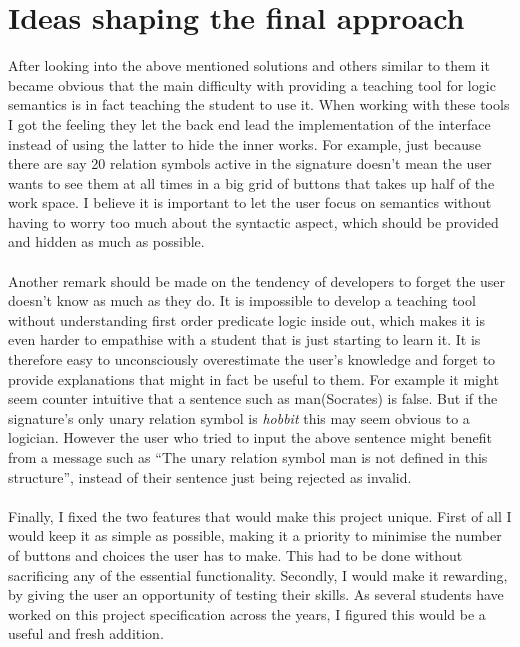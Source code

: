 \documentclass{report}
\begin{document}
\section{Ideas shaping the final approach}
After looking into the above mentioned solutions and others similar to them it became obvious that the main difficulty with providing a teaching tool for logic semantics is in fact teaching the student to use it. When working with these tools I got the feeling they let the back end lead the implementation of the interface instead of using the latter to hide the inner works. For example, just because there are say 20 relation symbols active in the signature doesn't mean the user wants to see them at all times in a big grid of buttons that takes up half of the work space. I believe it is important to let the user focus on semantics without having to worry too much about the syntactic aspect, which should be provided and hidden as much as possible. \\ \\
Another remark should be made on the tendency of developers to forget the user doesn't know as much as they do. It is impossible to develop a teaching tool without understanding first order predicate logic inside out, which makes it is even harder to empathise with a student that is just starting to learn it. It is therefore easy to unconsciously overestimate the user's knowledge and forget to provide explanations that might in fact be useful to them. For example it might seem counter intuitive that a sentence such as man(Socrates) is false. But if the signature's only unary relation symbol is \emph{hobbit} this may seem obvious to a logician. However the user who tried to input the above sentence might benefit from a message such as ``The unary relation symbol man is not defined in this structure'', instead of their sentence just being rejected as invalid. \\ \\
Finally, I fixed the two features that would make this project unique. First of all I would keep it as simple as possible, making it a priority to minimise the number of buttons and choices the user has to make. This had to be done without sacrificing any of the essential functionality. Secondly, I would make it rewarding, by giving the user an opportunity of testing their skills. As several students have worked on this project specification across the years, I figured this would be a useful and fresh addition.
\end{document}
